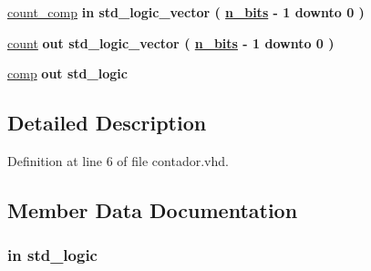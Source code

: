 \begin{DoxyCompactItemize}
\item 
\hyperlink{classcontador_a96447988f0843d79283d122598f5d510}{count\+\_\+comp}  {\bfseries {\bfseries \textcolor{keywordflow}{in}\textcolor{vhdlchar}{ }}} {\bfseries \textcolor{comment}{std\+\_\+logic\+\_\+vector}\textcolor{vhdlchar}{ }\textcolor{vhdlchar}{(}\textcolor{vhdlchar}{ }\textcolor{vhdlchar}{ }\textcolor{vhdlchar}{ }\textcolor{vhdlchar}{ }{\bfseries \hyperlink{classcontador_a986eb173f34190032418b47b9fc9b457}{n\+\_\+bits}} \textcolor{vhdlchar}{-\/}\textcolor{vhdlchar}{ } \textcolor{vhdldigit}{1} \textcolor{vhdlchar}{ }\textcolor{keywordflow}{downto}\textcolor{vhdlchar}{ }\textcolor{vhdlchar}{ } \textcolor{vhdldigit}{0} \textcolor{vhdlchar}{ }\textcolor{vhdlchar}{)}\textcolor{vhdlchar}{ }} 
\item 
\hyperlink{classcontador_a4566909c8f114af9a0e58632500cd4e9}{count}  {\bfseries {\bfseries \textcolor{keywordflow}{out}\textcolor{vhdlchar}{ }}} {\bfseries \textcolor{comment}{std\+\_\+logic\+\_\+vector}\textcolor{vhdlchar}{ }\textcolor{vhdlchar}{(}\textcolor{vhdlchar}{ }\textcolor{vhdlchar}{ }\textcolor{vhdlchar}{ }\textcolor{vhdlchar}{ }{\bfseries \hyperlink{classcontador_a986eb173f34190032418b47b9fc9b457}{n\+\_\+bits}} \textcolor{vhdlchar}{-\/}\textcolor{vhdlchar}{ } \textcolor{vhdldigit}{1} \textcolor{vhdlchar}{ }\textcolor{keywordflow}{downto}\textcolor{vhdlchar}{ }\textcolor{vhdlchar}{ } \textcolor{vhdldigit}{0} \textcolor{vhdlchar}{ }\textcolor{vhdlchar}{)}\textcolor{vhdlchar}{ }} 
\item 
\hyperlink{classcontador_a6fde1dafa392e429c8be2ce998a99f97}{comp}  {\bfseries {\bfseries \textcolor{keywordflow}{out}\textcolor{vhdlchar}{ }}} {\bfseries \textcolor{comment}{std\+\_\+logic}\textcolor{vhdlchar}{ }} 
\end{DoxyCompactItemize}


\subsection{Detailed Description}


Definition at line 6 of file contador.\+vhd.



\subsection{Member Data Documentation}
\hypertarget{classcontador_a4a4609c199d30b3adebbeb3a01276ec5}{}
\subsubsection[{clk}]{ {\bfseries \textcolor{keywordflow}{in}\textcolor{vhdlchar}{ }} {\bfseries \textcolor{comment}{std\+\_\+logic}\textcolor{vhdlchar}{ }} \hspace{0.3cm}{\ttfamily [Port]}}\label{classcontador_a4a4609c199d30b3adebbeb3a01276ec5}


